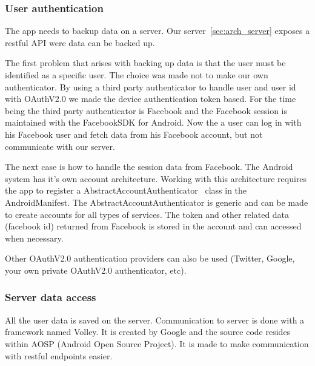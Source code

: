 
\subsubsection{User authentication}

The app needs to backup data on a server. Our server~\ref{sec:arch_server} exposes a restful API were data can be backed up.

The first problem that arises with backing up data is that the user must be identified as a specific user. The choice was made not to make our own authenticator. By using a third party authenticator to handle user and user id with OAuthV2.0 we made the device authentication token based. 
For the time being the third party authenticator is Facebook and the Facebook session is maintained with the FacebookSDK for Android. 
Now the a user can log in with his Facebook user and fetch data from his Facebook account, but not communicate with our server. 

The next case is how to handle the session data from Facebook. The Android system has it's own account architecture. Working with this architecture requires the app to register a AbstractAccountAuthenticator~\cite{androidAccount} class in the AndroidManifest. The AbstractAccountAuthenticator is generic and can be made to create accounts for all types of services. The token and other related data (facebook id) returned from Facebook is stored in the account and can accessed when necessary.

Other OAuthV2.0 authentication providers can also be used (Twitter, Google, your own private OAuthV2.0 authenticator, etc). 


\subsubsection{Server data access}

All the user data is saved on the server. Communication to server is done with a framework named Volley. It is created by Google and the source code resides within AOSP (Android Open Source Project). It is made to make communication with restful endpoints easier.

